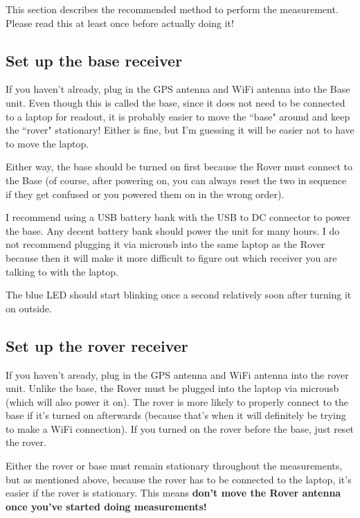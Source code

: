 \documentclass[usletter]{article}
\begin{document}
This section describes the recommended method to perform the measurement. Please read this at least once before actually doing it! 

\subsection{Set up the base receiver} 

If you haven't already, plug in the GPS antenna and WiFi antenna into the Base
unit. Even though this is called the base, since it does not need to be
connected to a laptop for readout, it is probably easier to move the ``base" around and
keep the ``rover" stationary!  Either is fine, but I'm guessing it will be easier not to have to move the laptop. 

Either way, the base should be turned on first because
the Rover must connect to the Base (of course, after powering on, you can
always reset the two in sequence if they get confused or you powered them on in
the wrong order). 

I recommend using a USB battery bank with the USB to DC connector to power the
base. Any decent battery bank should power the unit for many hours. I do not
recommend plugging it via microusb into the same laptop as the Rover because then it will
make it more difficult to figure out which receiver you are talking to with the
laptop. 

The blue LED should start blinking once a second relatively soon after turning it on outside. 


\subsection{Set up the rover receiver} 

If you haven't aready, plug in the GPS antenna and WiFi antenna into the rover
unit. Unlike the base, the Rover must be plugged into the laptop via microusb
(which will also power it on). The rover is more likely to properly connect to
the base if it's turned on afterwards (because that's when it will definitely
be trying to make a WiFi connection). If you turned on the rover before the
base, just reset the rover. 

Either the rover or base must remain stationary throughout the measurements, but as mentioned above, because the
rover has to be connected to the laptop, it's easier if the rover is
stationary.  This means \textbf{don't move the Rover antenna once you've started doing measurements!} 
\end{document}
